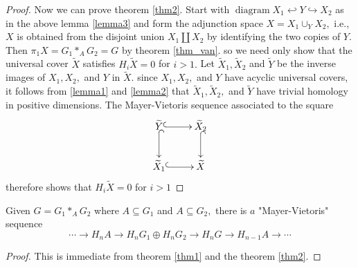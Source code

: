 \begin{proof}
Now we can prove theorem \ref{thm2}. Start with $\operatorname{diagram} X_{1} \hookleftarrow  Y \hookrightarrow X_{2}$ as in the above lemma \ref{lemma3} and form the adjunction space $X=X_{1} \cup_{Y} X_{2},$ i.e., $X$ is obtained from the disjoint union $X_{1} \coprod X_{2}$ by identifying the two copies of $Y .$ Then $\pi_{1} X=G_{1} *_{A} G_{2}=G$ by theorem \ref{thm_van}. so we need only show that the universal cover $\tilde{X}$ satisfies $H_{i} \tilde{X}=0$ for $i>1 .$ Let $\tilde{X}_{1}, \tilde{X}_{2}$ and $\tilde{Y}$ be the inverse images of $X_{1}, X_{2},$ and $Y$ in $\tilde{X}$. since $X_{1}, X_{2},$ and $Y$ have acyclic universal covers, it follows from \ref{lemma1} and \ref{lemma2} that $\tilde{X}_{1}, \tilde{X}_{2},$ and $\tilde{Y}$ have trivial homology in positive dimensions. The Mayer-Vietoris sequence associated to the square
$$
\xymatrix{
\widetilde{Y}\ar@{^{(}->}[d] \ar@{^{(}->}[r] &\widetilde{X}_2\ar@{^{(}->}[d]\\
 \widetilde{X}_1\ar@{^{(}->}[r] & \widetilde{X}}
$$
therefore shows that $H_{i} \tilde{X}=0$ for $i>1$
\end{proof}
\begin{corollary}
\label{cor1}
Given $G=G_{1} *_{A} G_{2}$ where $A \subseteq G_{1}$ and $A\subseteq G_{2},$ there is $a$ "Mayer-Vietoris" sequence
\[
\cdots \rightarrow H_{n} A \rightarrow H_{n} G_{1} \oplus H_{n} G_{2} \rightarrow H_{n} G \rightarrow H_{n-1} A \rightarrow \cdots
\]
\end{corollary}
\begin{proof}
This is immediate from theorem \ref{thm1} and the theorem \ref{thm2}.
\end{proof}


